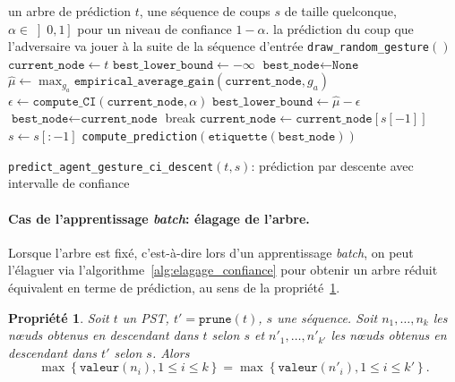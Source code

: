 \documentclass[10pt,a4paper]{article}
\theoremstyle{plain} %
\newtheorem{propr}{Propriété}
\theoremstyle{definition} %
\theoremstyle{remark} %
\def\noeuds{n\oe uds\xspace}
\begin{document}
\begin{algorithm}
\begin{algorithmic}[1]
\REQUIRE un arbre de prédiction $t$, une séquence de coups $s$ de taille quelconque, $\alpha \in \left ]0, 1\right ]$  pour un niveau de confiance $1-\alpha$.
\ENSURE la prédiction du coup que l'adversaire va jouer à la suite de la séquence d'entrée
    \RETURN \verb+draw_random_gesture+$()$
\ENDIF
\STATE $\texttt{current\_node} \leftarrow t$
\STATE $\texttt{best\_lower\_bound} \leftarrow -\infty$
\STATE $\texttt{best\_node} \leftarrow \texttt{None}$
\LOOP
    \STATE $\widehat{\mu}\leftarrow \max_{g_a} \texttt{empirical\_average\_gain}\left (\texttt{current\_node}, g_a\right )$ 
    \STATE $\epsilon \leftarrow \texttt{compute\_CI}\left (\texttt{current\_node}, \alpha\right )$ 
      \STATE $\texttt{best\_lower\_bound}\leftarrow \widehat{\mu}-\epsilon$
      \STATE $\texttt{best\_node} \leftarrow \texttt{current\_node}$
    \ENDIF
      \STATE break
    \ENDIF
    \STATE $\texttt{current\_node} \leftarrow \texttt{current\_node}\left [s\left [-1\right ]\right ]$
    \STATE $s \leftarrow s\left [:-1\right ]$
\ENDLOOP
\RETURN \verb+compute_prediction+$\left (\texttt{etiquette}\left (\texttt{best\_node}\right )\right )$
\end{algorithmic}
\caption{\texttt{predict_agent_gesture\_ci\_descent}$\left (t, s\right )$: prédiction par descente avec intervalle de confiance}
\label{alg:prediction_descente_ic}
\end{algorithm}

\paragraph{Cas de l'apprentissage \textit{batch}: élagage de l'arbre.}

Lorsque l'arbre est fixé, c'est-à-dire lors d'un apprentissage \textit{batch}, on peut l'élaguer via l'algorithme~\ref{alg:elagage_confiance} pour obtenir un arbre réduit équivalent en terme de prédiction, au sens de la propriété~\ref{thm:elagage}.

\begin{propr}\label{thm:elagage} Soit $t$ un PST, $t'=\texttt{prune}\left (t\right )$, $s$ une séquence. Soit $n_1, \ldots, n_k$ les \noeuds obtenus en descendant dans $t$ selon $s$ et $n'_1, \ldots, n'_{k'}$ les \noeuds obtenus en descendant dans $t'$ selon $s$. Alors $$\max\left \lbrace \texttt{valeur}\left (n_i\right ), 1 \leq i \leq k\right \rbrace = \max\left \lbrace \texttt{valeur}\left (n'_i\right ), 1 \leq i \leq k'\right \rbrace.$$
\end{propr}
\end{document}

